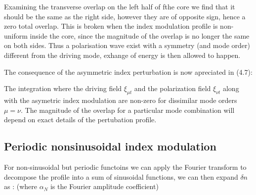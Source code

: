 \documentclass[11pt, openright]{book}
\begin{document}

          Examining the transverse overlap on the left half of fthe core we find that it should be the same as the right side, however they are of opposite sign, hence a zero total overlap. This is broken when the index modulation profile is non-uniform inside the core, since the magnitude of the overlap is no longer the same on both sides. Thus a polarisation wave exist with a symmetry (and mode order) different from the driving mode, exhange of energy is then allowed to happen.

          The consequence of the asymmetric index perturbation is now apreciated in (4.7):

          

         The integration where the driving field $\xi_{\mu t}$ and the polarization field $\xi_{\nu t}$ along with the asymetric index modulation are non-zero for dissimilar mode orders $\mu=\nu$. The magnitude of the overlap for a particular mode combination will depend on exact details of the pertubation profile.

          \subsection*{Periodic nonsinusoidal index modulation}

          For non-sinusoidal but periodic functoins we can apply the Fourier transform to decompose the profile into a sum of sinusoidal functions, we can then expand $\delta n$ as : 
          \hfill (where $\alpha_N$ is the Fourier amplitude coefficient)
\end{document}
